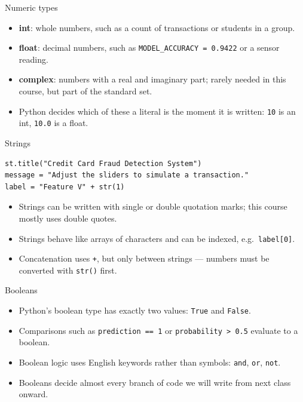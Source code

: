 \begin{frame}{Numeric types}
\begin{itemize}
\item \textbf{int}: whole numbers, such as a count of transactions or students in a group.
\item \textbf{float}: decimal numbers, such as \texttt{MODEL\_ACCURACY = 0.9422} or a sensor reading.
\item \textbf{complex}: numbers with a real and imaginary part; rarely needed in this course, but part of the standard set.
\item Python decides which of these a literal is the moment it is written: \texttt{10} is an int, \texttt{10.0} is a float.
\end{itemize}
\coursefooter
\end{frame}

\begin{frame}[fragile]{Strings}
\begin{lstlisting}[style=coursepython]
st.title("Credit Card Fraud Detection System")
message = "Adjust the sliders to simulate a transaction."
label = "Feature V" + str(1)
\end{lstlisting}
\begin{itemize}
\item Strings can be written with single or double quotation marks; this course mostly uses double quotes.
\item Strings behave like arrays of characters and can be indexed, e.g.\ \texttt{label[0]}.
\item Concatenation uses \texttt{+}, but only between strings --- numbers must be converted with \texttt{str()} first.
\end{itemize}
\coursefooter
\end{frame}

\begin{frame}{Booleans}
\begin{itemize}
\item Python's boolean type has exactly two values: \texttt{True} and \texttt{False}.
\item Comparisons such as \texttt{prediction == 1} or \texttt{probability > 0.5} evaluate to a boolean.
\item Boolean logic uses English keywords rather than symbols: \texttt{and}, \texttt{or}, \texttt{not}.
\item Booleans decide almost every branch of code we will write from next class onward.
\end{itemize}
\coursefooter
\end{frame}

